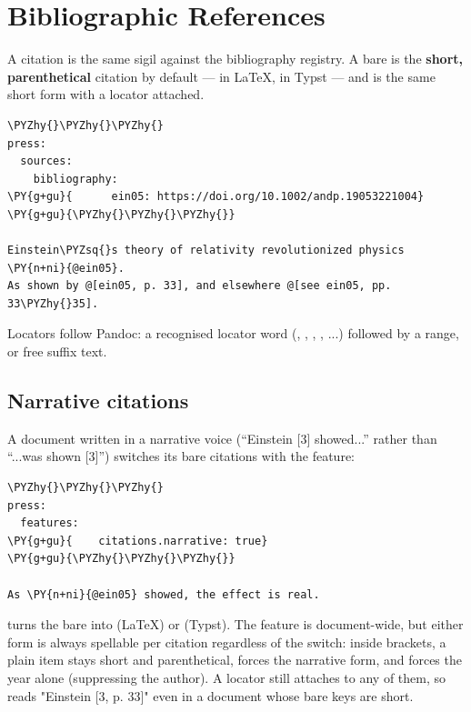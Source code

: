 \documentclass[a4paper,twoside]{article}
\begin{document}
\section{Bibliographic References}
A citation is the same sigil against the bibliography registry. A bare 
is the \textbf{short, parenthetical} citation by default ---  in \LaTeX{},
 in Typst --- and  is the same short form with a
locator attached.
\begin{tscode}[lang=md, engine=pygments]
\begin{Verbatim}[commandchars=\\\{\},breaklines, breakanywhere, commandchars=\\\{\}]
\PYZhy{}\PYZhy{}\PYZhy{}
press:
  sources:
    bibliography:
\PY{g+gu}{      ein05: https://doi.org/10.1002/andp.19053221004}
\PY{g+gu}{\PYZhy{}\PYZhy{}\PYZhy{}}

Einstein\PYZsq{}s theory of relativity revolutionized physics \PY{n+ni}{@ein05}.
As shown by @[ein05, p. 33], and elsewhere @[see ein05, pp. 33\PYZhy{}35].
\end{Verbatim}
\end{tscode}
Locators follow Pandoc: a recognised locator word (, , , ,
...) followed by a range, or free suffix text.
\subsection{Narrative citations}
A document written in a narrative voice (\enquote{Einstein [3] showed...} rather than
\enquote{...was shown [3]}) switches its bare citations with the 
feature:
\begin{tscode}[lang=md, engine=pygments]
\begin{Verbatim}[commandchars=\\\{\},breaklines, breakanywhere, commandchars=\\\{\}]
\PYZhy{}\PYZhy{}\PYZhy{}
press:
  features:
\PY{g+gu}{    citations.narrative: true}
\PY{g+gu}{\PYZhy{}\PYZhy{}\PYZhy{}}

As \PY{n+ni}{@ein05} showed, the effect is real.
\end{Verbatim}
\end{tscode}
turns the bare  into  (\LaTeX{}) or
 (Typst). The feature is document-wide, but
either form is always spellable per citation regardless of the switch: inside
brackets, a plain item stays short and parenthetical,  forces the
narrative form, and  forces the year alone (suppressing the author).
A locator still attaches to any of them, so  reads "Einstein
[3, p. 33]" even in a document whose bare keys are short.
\end{document}
